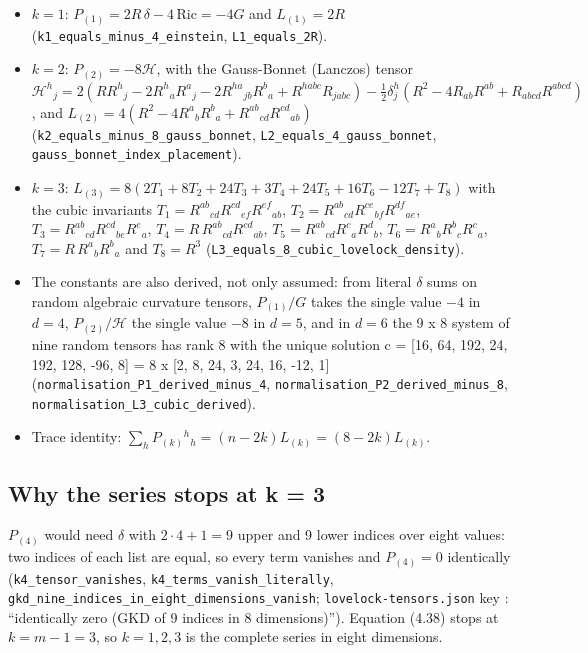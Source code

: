 \documentclass[11pt]{article}
\begin{document}
\begin{itemize}
\item $k = 1$: $P_{(1)} = 2R\,\delta - 4\,\mathrm{Ric} = -4G$ and $L_{(1)} = 2R$ (\texttt{k1\_equal\allowbreak{}s\_minus\_\allowbreak{}4\_einste\allowbreak{}in}, \texttt{L1\_equal\allowbreak{}s\_2R}).
\item $k = 2$: $P_{(2)} = -8\mathcal{H}$, with the Gauss-Bonnet (Lanczos) tensor $\mathcal{H}^h{}_j = 2(RR^h{}_j - 2R^h{}_aR^a{}_j - 2R^{ha}{}_{jb}R^b{}_a + R^{habc}R_{jabc}) - \frac12\delta^h_j(R^2 - 4R_{ab}R^{ab} + R_{abcd}R^{abcd})$, and $L_{(2)} = 4(R^2 - 4R^a{}_bR^b{}_a + R^{ab}{}_{cd}R^{cd}{}_{ab})$ (\texttt{k2\_equal\allowbreak{}s\_minus\_\allowbreak{}8\_gauss\_\allowbreak{}bonnet}, \texttt{L2\_equal\allowbreak{}s\_4\_gaus\allowbreak{}s\_bonnet}, \texttt{gauss\_bo\allowbreak{}nnet\_ind\allowbreak{}ex\_place\allowbreak{}ment}).
\item $k = 3$: $L_{(3)} = 8(2T_1 + 8T_2 + 24T_3 + 3T_4 + 24T_5 + 16T_6 - 12T_7 + T_8)$ with the cubic invariants $T_1 = R^{ab}{}_{cd}R^{cd}{}_{ef}R^{ef}{}_{ab}$, $T_2 = R^{ab}{}_{cd}R^{ce}{}_{bf}R^{df}{}_{ae}$, $T_3 = R^{ab}{}_{cd}R^{cd}{}_{be}R^e{}_a$, $T_4 = R\,R^{ab}{}_{cd}R^{cd}{}_{ab}$, $T_5 = R^{ab}{}_{cd}R^c{}_aR^d{}_b$, $T_6 = R^a{}_bR^b{}_cR^c{}_a$, $T_7 = R\,R^a{}_bR^b{}_a$ and $T_8 = R^3$ (\texttt{L3\_equal\allowbreak{}s\_8\_cubi\allowbreak{}c\_lovelo\allowbreak{}ck\_densi\allowbreak{}ty}).
\item The constants are also derived, not only assumed: from literal $\delta$ sums on random algebraic curvature tensors, $P_{(1)}/G$ takes the single value $-4$ in $d = 4$, $P_{(2)}/\mathcal{H}$ the single value $-8$ in $d = 5$, and in $d = 6$ the 9 x 8 system of nine random tensors has rank 8 with the unique solution c = [16, 64, 192, 24, 192, 128, -96, 8] = 8 x [2, 8, 24, 3, 24, 16, -12, 1] (\texttt{normalis\allowbreak{}ation\_P1\allowbreak{}\_derived\allowbreak{}\_minus\_4}, \texttt{normalis\allowbreak{}ation\_P2\allowbreak{}\_derived\allowbreak{}\_minus\_8}, \texttt{normalis\allowbreak{}ation\_L3\allowbreak{}\_cubic\_d\allowbreak{}erived}).
\item Trace identity: $\sum_hP_{(k)}{}^h{}_h = (n - 2k)L_{(k)} = (8 - 2k)L_{(k)}$.
\end{itemize}

\subsection{Why the series stops at k = 3}

$P_{(4)}$ would need $\delta$ with $2\cdot4 + 1 = 9$ upper and 9 lower indices over eight values: two indices of each list are equal, so every term vanishes and $P_{(4)} = 0$ identically (\texttt{k4\_tenso\allowbreak{}r\_vanish\allowbreak{}es}, \texttt{k4\_terms\allowbreak{}\_vanish\_\allowbreak{}literall\allowbreak{}y}, \texttt{gkd\_nine\allowbreak{}\_indices\allowbreak{}\_in\_eigh\allowbreak{}t\_dimens\allowbreak{}ions\_van\allowbreak{}ish}; \texttt{lovelock\allowbreak{}-tensors\allowbreak{}.json} key \texttt{}: ``identically zero (GKD of 9 indices in 8 dimensions)''). Equation (4.38) stops at $k = m - 1 = 3$, so $k = 1, 2, 3$ is the complete series in eight dimensions.
\end{document}
